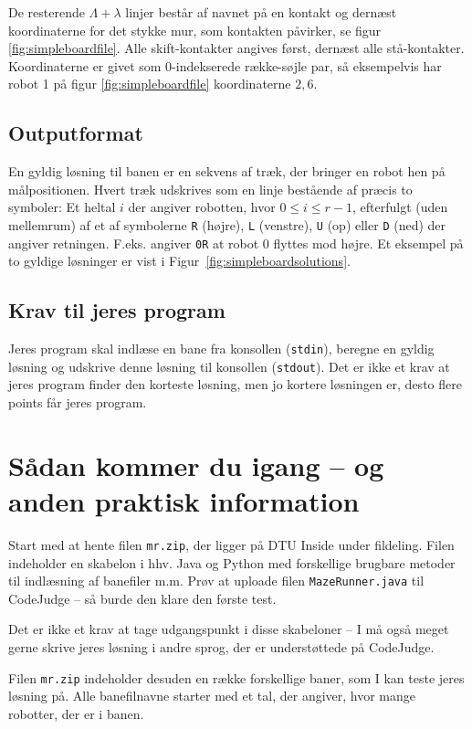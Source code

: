 \documentclass[10pt, a4paper]{article}
\begin{document}
De resterende $\Lambda+\lambda$ linjer består af navnet på en kontakt og dernæst koordinaterne for det stykke mur, som kontakten påvirker, se figur \ref{fig:simpleboardfile}.
Alle skift-kontakter angives først, dernæst alle stå-kontakter.
Koordinaterne er givet som 0-indekserede række-søjle par, så eksempelvis har robot 1 på figur \ref{fig:simpleboardfile} koordinaterne $2, 6$.

\subsection{Outputformat}
En gyldig løsning til banen er en sekvens af træk, der bringer en robot hen på målpositionen.
Hvert træk udskrives som en linje bestående af præcis to symboler: Et heltal $i$ der angiver robotten, hvor $0 \leq i \leq r-1$, efterfulgt (uden mellemrum) af et af symbolerne \texttt{R} (højre), \texttt{L} (venstre), \texttt{U} (op) eller \texttt{D} (ned) der angiver retningen.
F.eks. angiver \texttt{0R} at robot 0 flyttes mod højre. Et eksempel på to gyldige løsninger er vist i Figur~\ref{fig:simpleboardsolutions}.

\subsection{Krav til jeres program}
Jeres program skal indlæse en bane fra konsollen (\texttt{stdin}), beregne en gyldig løsning og udskrive denne løsning til konsollen (\texttt{stdout}).
Det er ikke et krav at jeres program finder den korteste løsning, men jo kortere løsningen er, desto flere points får jeres program.

\section{Sådan kommer du igang -- og anden praktisk information}
Start med at hente filen \texttt{mr.zip}, der ligger på DTU Inside under fildeling.
Filen indeholder en skabelon i hhv. Java og Python med forskellige brugbare metoder til indlæsning af banefiler m.m.
Prøv at uploade filen \texttt{MazeRunner.java} til CodeJudge -- så burde den klare den første test.

Det er ikke et krav at tage udgangspunkt i disse skabeloner -- I må også meget gerne skrive jeres løsning i andre sprog, der er understøttede på CodeJudge.

Filen \texttt{mr.zip} indeholder desuden en række forskellige baner, som I kan teste jeres løsning på.
Alle banefilnavne starter med et tal, der angiver, hvor mange robotter, der er i banen.
\end{document}
